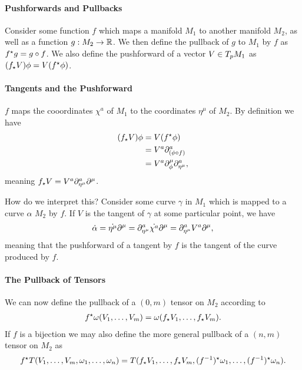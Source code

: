 \paragraph{Pushforwards and Pullbacks}
Consider some function $f$ which maps a manifold $M_{1}$ to another manifold $M_{2}$, as well as a function $g: M_{2}\to\mathbb{R}$. We then define the pullback of $g$ to $M_{1}$ by $f$ as $f^{\star}g = g\circ f$. We also define the pushforward of a vector $V\in T_{p}M_{1}$ as $(f_{\star}V)\phi = V(f^{\star}\phi)$.

\paragraph{Tangents and the Pushforward}
$f$ maps the cooordinates $\chi^{a}$ of $M_{1}$ to the coordinates $\eta^{\mu}$ of $M_{2}$. By definition we have
\begin{align*}
(f_{\star}V)\phi &= V(f^{\star}\phi) \\
&= V^{a}\partial^{a}_{(\phi\circ f)} \\
&= V^{a}\partial^{\mu}_{\phi}\partial^{a}_{\eta^{\mu}},
\end{align*}
meaning $f_{\star}V = V^{a}\partial^{a}_{\eta^{\mu}}\partial^{\mu}_{}$.

How do we interpret this? Consider some curve $\gamma$ in $M_{1}$ which is mapped to a curve $\alpha$ $M_{2}$ by $f$. If $V$ is the tangent of $\gamma$ at some particular point, we have
\begin{align*}
\dot{\alpha} = \dot{\eta^{\mu}}\partial^{\mu}_{} = \partial^{a}_{\eta^{\mu}}\dot{\chi^{a}}\partial^{\mu}_{} = \partial^{a}_{\eta^{\mu}}V^{a}\partial^{\mu}_{},
\end{align*}
meaning that the pushforward of a tangent by $f$ is the tangent of the curve produced by $f$.

\paragraph{The Pullback of Tensors}
We can now define the pullback of a $(0, m)$ tensor on $M_{2}$ according to
\begin{align*}
	f^{\star}\omega(V_{1}, \dots, V_{m}) = \omega(f_{\star}V_{1}, \dots, f_{\star}V_{m}).
\end{align*}
If $f$ is a bijection we may also define the more general pullback of a $(n, m)$ tensor on $M_{2}$ as
\begin{align*}
	f^{\star}T(V_{1}, \dots, V_{m}, \omega_{1}, \dots, \omega_{n}) = T(f_{\star}V_{1}, \dots, f_{\star}V_{m}, (f^{-1})^{\star}\omega_{1}, \dots, (f^{-1})^{\star}\omega_{n}).
\end{align*}

